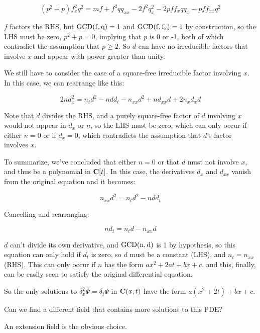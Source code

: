 \documentclass{article}
\newcommand{\C}{\ensuremath{{\bf C}}}
\newcommand{\GCD}{\ensuremath{\rm{GCD}}}
\begin{document}
$$(p^{2} +p)f_x^{2}q^{2} = m f+f^{2}qq_{xx} -2f^{2}q_x^{2} -2pff_xqq_x +pff_{xx}q^{2}$$

$f$ factors the RHS, but $\GCD(f,q)=1$ and $\GCD(f,f_x)=1$ by
construction, so the LHS must be zero, $p^2 + p = 0$, implying that
$p$ is 0 or -1, both of which contradict the assumption that $p \ge
2$.  So $d$ can have no irreducible factors that involve $x$ and
appear with power greater than unity.

\begin{comment}
The leading term in $2nd_x^2 - n d_{xx} d$ is of power $x^{2r-2}$ and
has coefficient $2r^2 d_r - r(r-1)d_r^2$, so $r^2 + r =0$, and $r$
must be either $0$ or $-1$.  Obviously it can't be $-1$, what about
$0$?  Then $d$ would be a polynomial in $t$ that didn't involve $x$.
\end{comment}

We still have to consider the case of a square-free irreducible factor
involving $x$.  In this case, we can rearrange like this:

$$2nd_x^2 = n_t d^2 - n d d_t - n_{xx} d^2 + n d_{xx} d + 2 n_{x}d_{x}d$$

Note that $d$ divides the RHS, and a purely square-free factor of $d$
involving $x$ would not appear in $d_x$ or $n$, so the LHS must be
zero, which can only occur if either $n=0$ or if $d_x=0$, which
contradicts the assumption that $d$'s factor involves $x$.

To summarize, we've concluded that either $n=0$ or that $d$ must not
involve $x$, and thus be a polynomial in $\C[t]$.  In this case, the
derivatives $d_x$ and $d_{xx}$ vanish from the original equation and it becomes:

$$n_{xx} d^2 = n_t d^2 - n d d_t$$

Cancelling and rearranging:

$$n d_t = n_t d - n_{xx} d$$

$d$ can't divide its own derivative, and $\GCD(n,d)$ is 1 by
hypothesis, so this equation can only hold if $d_t$ is zero, so $d$
must be a constant (LHS), and $n_t = n_{xx}$ (RHS).  This can only
occur if $n$ has the form $ax^2 + 2at + bx +c$, and this, finally, can
be easily seen to satisfy the original differential equation.

So the only solutions to $\delta_x^2 \Psi = \delta_t \Psi$ in
$\C(x,t)$ have the form $a(x^2+2t)+bx+c$.

Can we find a different field that contains more solutions to this PDE?

An extension field is the obvious choice.
\end{document}

